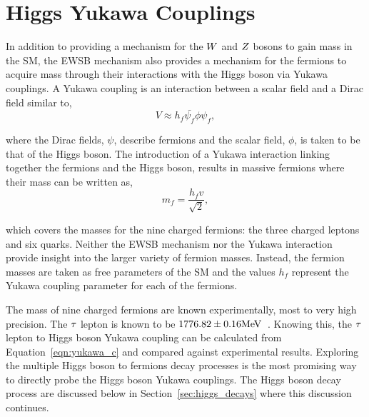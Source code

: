\section{Higgs Yukawa Couplings}
In addition to providing a mechanism for the $W$ and $Z$ bosons to gain mass in the SM, the EWSB mechanism also
provides a mechanism for the fermions to acquire mass through their interactions with the Higgs boson
via Yukawa couplings. A Yukawa coupling is an interaction between a scalar field and a Dirac field
similar to,
\begin{equation}
V \approx h_{f}\bar{\psi_{f}}\phi\psi_{f},
\end{equation}

where the Dirac fields, $\psi$, describe fermions and the scalar field, $\phi$, is taken to be that of the Higgs boson. 
The introduction of a Yukawa interaction linking together the fermions and the Higgs boson,
results in massive fermions where their mass can be written as,
\begin{equation}
m_{f} = \frac{h_{f} v}{\sqrt{2}},
\label{eqn:yukawa_c}
\end{equation}

which covers the masses for the nine charged fermions: the three charged leptons and six quarks.
Neither the EWSB mechanism nor the Yukawa interaction provide insight into the larger variety of fermion
masses. Instead, the fermion masses are taken as free parameters of the SM and the values
$h_{f}$ represent the Yukawa coupling parameter for each of the fermions.

The mass of nine charged fermions are known experimentally, most to very high precision.
The $\tau$ lepton is known to be $1776.82\pm0.16\mathrm{MeV}$~\cite{PDG}.
Knowing this, the $\tau$ lepton to Higgs boson Yukawa coupling can be calculated from 
Equation~\ref{eqn:yukawa_c} and compared against experimental results. 
Exploring the multiple Higgs boson to fermions decay processes is the most promising way to directly probe
the Higgs boson Yukawa couplings. The Higgs boson decay process are discussed below in 
Section~\ref{sec:higgs_decays} where this discussion continues.




